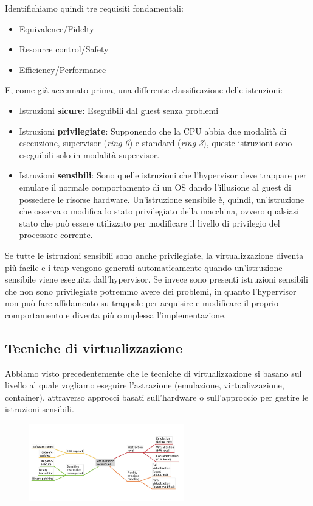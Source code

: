 \documentclass{article}
\begin{document}
		Identifichiamo quindi tre requisiti fondamentali:
		\begin{itemize}
			\item Equivalence/Fidelty
			\item Resource control/Safety
			\item Efficiency/Performance
		\end{itemize}
		E, come già accennato prima, una differente classificazione delle istruzioni:
		\begin{itemize}
		    \item Istruzioni \textbf{sicure}: Eseguibili dal guest senza problemi
		    \item Istruzioni \textbf{privilegiate}: Supponendo che la CPU abbia due modalità di esecuzione, supervisor (\textit{ring 0}) e standard (\textit{ring 3}), queste istruzioni sono eseguibili solo in modalità supervisor.
		    \item Istruzioni \textbf{sensibili}: Sono quelle istruzioni che l'hypervisor deve trappare per emulare il normale comportamento di un OS dando l'illusione al guest di possedere le risorse hardware. Un'istruzione sensibile è, quindi, un'istruzione che osserva o modifica lo stato privilegiato della macchina, ovvero qualsiasi stato che può essere utilizzato per modificare il livello di privilegio del processore corrente. 
		\end{itemize}
		Se tutte le istruzioni sensibili sono anche privilegiate, la virtualizzazione diventa più facile e i trap vengono generati automaticamente quando un'istruzione sensibile viene eseguita dall'hypervisor. Se invece sono presenti istruzioni sensibili che non sono privilegiate potremmo avere dei problemi, in quanto l'hypervisor non può fare affidamento su trappole per acquisire e modificare il proprio comportamento e diventa più complessa l'implementazione. 
		
		\newpage
		\subsection{Tecniche di virtualizzazione}
		Abbiamo visto precedentemente che le tecniche di virtualizzazione si basano sul livello al quale vogliamo eseguire l'astrazione (emulazione, virtualizzazione, container), 
		attraverso approcci basati sull'hardware o sull'approccio per gestire le istruzioni sensibili.
		\begin{figure}[ht]
		    \centering
		    \includegraphics[width=0.6\textwidth]{SAC_B1_virtualizationTechnicques.png}
		\end{figure}
		
\end{document}
